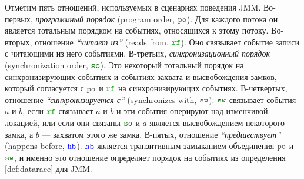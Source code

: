 Отметим пять отношений, используемых в сценариях поведения JMM.
Во-первых, \emph{программный порядок} (program order, $\lPO$).
Для каждого потока он является тотальным порядком на событиях, относящихся к этому потоку.
Во-вторых,  отношение \emph{``читает из''} (reads from, $\lRF$).
Оно связывает событие записи с читающими из него событиями.
В-третьих, \emph{синхронизационный порядок} (synchronization order, $\lSO$).
Это некоторый тотальный порядок на синхронизирующих событиях и событиях захвата и высвобождения замков,
который согласуется с $\lPO$ и $\lRF$ на синхронизирующих событиях.
В-четвертых, отношение \emph{``синхронизируется с''} (synchronizes-with, $\lSW$).
$\lSW$ связывает события $a$ и $b$, если $\lRF$ связывает $a$ и $b$ и эти события оперируют над изменчивой локацией,
или если они связаны $\lSO$ и $a$ является высвобождением некоторого замка, а $b$ --- захватом этого же замка.
В-пятых, отношение \emph{``предшествует''} (happens-before, $\lHB$).
$\lHB$ является транзитивным замыканием объединения $\lPO$ и $\lSW$, и именно это отношение определяет порядок
на событиях из определения \ref{def:datarace} для JMM.

